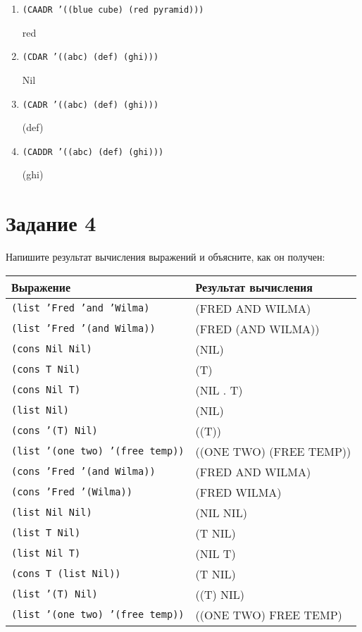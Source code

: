 \begin{enumerate}
	\item \texttt{(CAADR '((blue cube) (red pyramid)))}
	
	red
	\item \texttt{(CDAR '((abc) (def) (ghi)))}
	
	Nil
	\item \texttt{(CADR '((abc) (def) (ghi)))}
	
	(def)
	\item \texttt{(CADDR '((abc) (def) (ghi)))}
	
	(ghi)
\end{enumerate}

\section{Задание 4}

Напишите результат вычисления выражений и объясните, как он получен:

\begin{table}[H]
	\begin{tabularx}{\textwidth}{|X|X|}
		\hline
		Выражение & Результат вычисления \\ \hline
		\texttt{(list 'Fred 'and 'Wilma)} & (FRED AND WILMA) \\ \hline
		\texttt{(list 'Fred '(and Wilma))} & (FRED (AND WILMA)) \\ \hline
		\texttt{(cons Nil Nil)} & (NIL) \\ \hline
		\texttt{(cons T Nil)} & (T) \\ \hline
		\texttt{(cons Nil T)} & (NIL . T) \\ \hline
		\texttt{(list Nil)} & (NIL) \\ \hline
		\texttt{(cons '(T) Nil)} & ((T)) \\ \hline
		\texttt{(list '(one two) '(free temp))} & ((ONE TWO) (FREE TEMP)) \\ \hline
		\texttt{(cons 'Fred '(and Wilma))} & (FRED AND WILMA) \\ \hline
		\texttt{(cons 'Fred '(Wilma))} & (FRED WILMA) \\ \hline
		\texttt{(list Nil Nil)} & (NIL NIL) \\ \hline
		\texttt{(list T Nil)} & (T NIL) \\ \hline
		\texttt{(list Nil T)} & (NIL T) \\ \hline
		\texttt{(cons T (list Nil))} & (T NIL) \\ \hline
		\texttt{(list '(T) Nil)} & ((T) NIL) \\ \hline
		\texttt{(list '(one two) '(free temp))} & ((ONE TWO) FREE TEMP) \\ \hline
	\end{tabularx}
\end{table}


